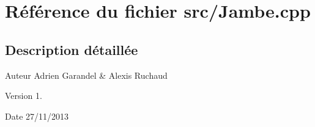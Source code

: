 \section{Référence du fichier src/\-Jambe.cpp}
\label{_jambe_8cpp}


\subsection{Description détaillée}
\begin{DoxyAuthor}{Auteur}
Adrien Garandel \& Alexis Ruchaud 
\end{DoxyAuthor}
\begin{DoxyVersion}{Version}
1. 
\end{DoxyVersion}
\begin{DoxyDate}{Date}
27/11/2013 
\end{DoxyDate}
